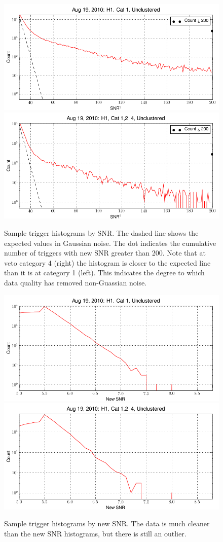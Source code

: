 \begin{figure}
  \includegraphics[width=0.5\linewidth]{figures/detchar/H1_1_UNCLUSTERED_snr_hist.png}
  \includegraphics[width=0.5\linewidth]{figures/detchar/H1_4_UNCLUSTERED_snr_hist.png}
  \caption[Trigger SNR histograms for H1]{
  \label{f:daily_ihope_gaussianity}
Sample trigger histograms by SNR.  The dashed line shows the
expected values in Gaussian noise.  The dot indicates the cumulative
number of triggers with new SNR greater than 200.  Note that at veto
category 4 (right) the histogram is closer to the expected line than
it is at category 1 (left).  This indicates the degree to which data
quality has removed non-Guassian noise.}
\end{figure}%



\begin{figure}
  \includegraphics[width=0.5\linewidth]{figures/detchar/H1_1_UNCLUSTERED_new_snr_hist.png}
  \includegraphics[width=0.5\linewidth]{figures/detchar/H1_4_UNCLUSTERED_new_snr_hist.png}
  \caption[Trigger new SNR histograms for H1]{
  \label{f:daily_ihope_gaussianity}
Sample trigger histograms by new SNR. The data is much cleaner than
the new SNR histograms, but there is still an outlier.}
\end{figure}%



